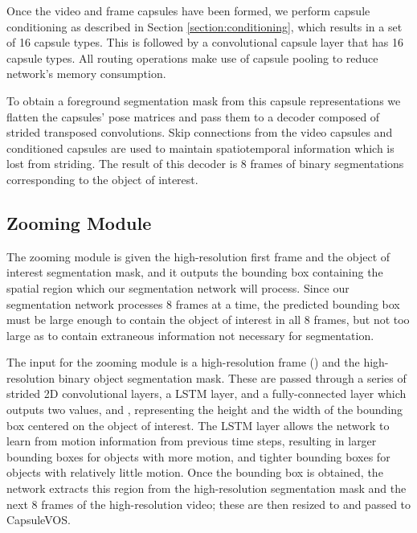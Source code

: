 \documentclass[10pt,twocolumn,letterpaper]{article}
\begin{document}
Once the video and frame capsules have been formed, we perform capsule conditioning as described in Section \ref{section:conditioning}, which results in a set of 16 capsule types. This is followed by a convolutional capsule layer that has 16 capsule types. All routing operations make use of capsule pooling \cite{duarte2018videocapsulenet} to reduce network's memory consumption. 

To obtain a foreground segmentation mask from this capsule representations we flatten the capsules' pose matrices and pass them to a decoder composed of strided transposed convolutions. Skip connections from the video capsules and conditioned capsules are used to maintain spatiotemporal information which is lost from striding. The result of this decoder is 8 frames of binary segmentations corresponding to the object of interest.


\subsection{Zooming Module}
The zooming module is given the high-resolution first frame and the object of interest segmentation mask, and it outputs the bounding box containing the spatial region which our segmentation network will process. Since our segmentation network processes 8 frames at a time, the predicted bounding box must be large enough to contain the object of interest in all 8 frames, but not too large as to contain extraneous information not necessary for segmentation.

The input for the zooming module is a high-resolution frame () and the high-resolution binary object segmentation mask. These are passed through a series of strided 2D convolutional layers, a LSTM layer, and a fully-connected layer which outputs two values,  and , representing the height and the width of the bounding box centered on the object of interest. The LSTM layer allows the network to learn from motion information from previous time steps, resulting in larger bounding boxes for objects with more motion, and tighter bounding boxes for objects with relatively little motion. Once the bounding box is obtained, the network extracts this region from the high-resolution segmentation mask and the next 8 frames of the high-resolution video; these are then resized to  and passed to CapsuleVOS. 
\end{document}
